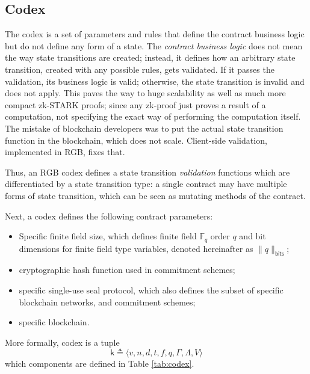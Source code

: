 \documentclass[9pt,oneside]{amsart}
\begin{document}
\begin{multicols}{2}


\subsection{Codex}\label{Codex}

The codex is a set of parameters and rules that define the contract business logic
but do not define any form of a state. The \emph{contract business logic} does not mean
the way state transitions are created; instead, it defines how an arbitrary
state transition, created with any possible rules, gets validated. If it passes the validation,
its business logic is valid; otherwise, the state transition is invalid and does not apply.
This paves the way to huge scalability as well as much more compact zk-STARK proofs;
since any zk-proof just proves a result of a computation,
not specifying the exact way of performing the computation itself.
The mistake of blockchain developers was to put the actual state transition function in
the blockchain, which does not scale. Client-side validation, implemented in RGB, fixes that.

Thus, an RGB codex defines a state transition \emph{validation} functions
which are differentiated by a state transition type:
a single contract may have multiple forms of state transition,
which can be seen as mutating methods of the contract.

Next, a codex defines the following contract parameters:

\begin{itemize}
\item Specific finite field size, which defines finite field $\mathbb{F}_q$ order $q$ and
  bit dimensions for finite field type variables, denoted hereinafter as $\|q\|_\mathsf{bits}$;
\item cryptographic hash function used in commitment schemes;
\item specific single-use seal protocol, which also defines the subset of specific blockchain networks,
  and commitment schemes;
\item specific blockchain.
\end{itemize}

More formally, codex is a tuple
\noindent
\begin{equation}
\mathsf{k} \triangleq \langle v, n, d, t, f, q, \mathsf{\Gamma}, \mathsf{\Lambda}, V \rangle
\end{equation}
\noindent
which components are defined in Table \ref{tab:codex}.

\end{multicols}
\end{document}
